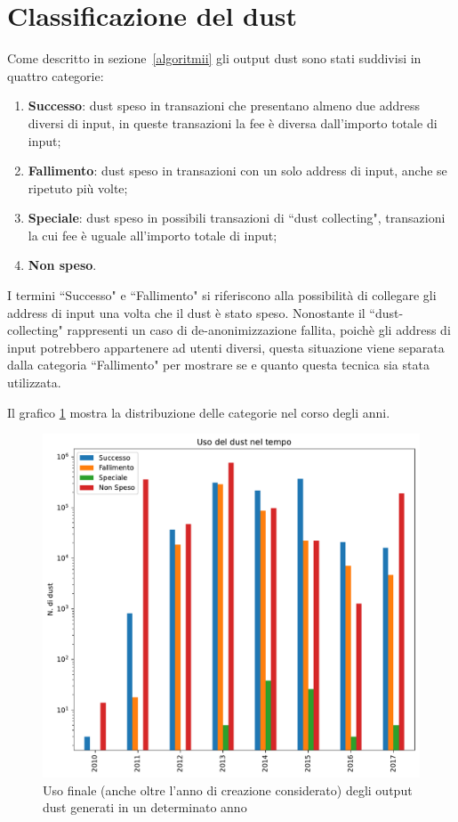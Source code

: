 \section{Classificazione del dust}
Come descritto in sezione~\ref{algoritmii} gli output dust sono stati suddivisi in quattro categorie:
\begin{enumerate}
    \item \textbf{Successo}: dust speso in transazioni che presentano almeno due address diversi di input, in queste transazioni la fee è diversa dall'importo totale di input;
    \item \textbf{Fallimento}: dust speso in transazioni con un solo address di input, anche se ripetuto più volte;
    \item \textbf{Speciale}: dust speso in possibili transazioni di ``dust collecting", transazioni la cui fee è uguale all'importo totale di input;
    \item \textbf{Non speso}.
\end{enumerate}

I termini ``Successo" e ``Fallimento" si riferiscono alla possibilità di collegare gli address di input una volta che il dust è stato speso. Nonostante il ``dust-collecting" rappresenti un caso di de-anonimizzazione fallita, poichè gli address di input potrebbero appartenere ad utenti diversi, questa situazione viene separata dalla categoria ``Fallimento" per mostrare se e quanto questa tecnica sia stata utilizzata.

Il grafico \ref{fig:dust_year} mostra la distribuzione delle categorie nel corso degli anni.
\begin{figure}[h!]
    \centering
    \includegraphics[scale=0.6]{Grafici/uso_del_dust_new.pdf}
    \caption{Uso finale (anche oltre l'anno di creazione considerato) degli output dust generati in un determinato anno}
    \label{fig:dust_year}
\end{figure}
\FloatBarrier

